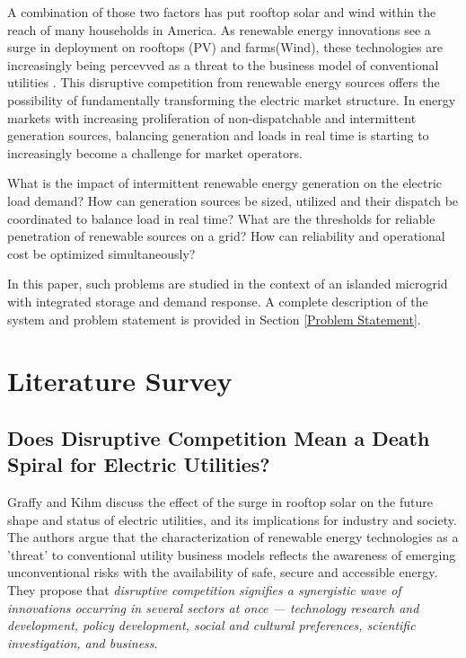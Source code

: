 \documentclass[a4paper]{article}
\begin{document}
A combination of those two factors has put rooftop solar and wind within the reach of many households in America. As renewable energy innovations see a surge in deployment on rooftops (PV) and farms(Wind), these technologies are increasingly being percevved as a threat to the business model of conventional utilities \cite{graffy2014does}. This disruptive competition from renewable energy sources offers the possibility of fundamentally transforming the electric market structure. In energy markets with increasing proliferation of non-dispatchable and intermittent generation sources, balancing generation and loads in real time is starting to increasingly become a challenge for market operators. 

What is the impact of intermittent renewable energy generation on the electric load demand? How can generation sources be sized, utilized and their dispatch be coordinated to balance load in real time? What are the thresholds for reliable penetration of renewable sources on a grid? How can reliability and operational cost be optimized simultaneously? 

In this paper, such problems are studied in the context of an islanded microgrid with integrated storage and demand response. A complete description of the system and problem statement is provided in Section \ref{Problem Statement}.

 



\section{Literature Survey}

\subsection{Does Disruptive Competition Mean a Death Spiral for Electric Utilities?}

Graffy and Kihm \cite{graffy2014does} discuss the effect of the surge in rooftop solar on the future shape and status of electric utilities, and its implications for industry and society. The authors argue that the characterization of renewable energy technologies as a 'threat' to conventional utility business models reflects the awareness of emerging unconventional risks with the availability of safe, secure and accessible energy.  They propose that \textit{disruptive competition signifies a synergistic wave of innovations occurring in several sectors at once
 — 
technology research and development, policy development, social and cultural preferences, scientific investigation, and business}. 
\end{document}
